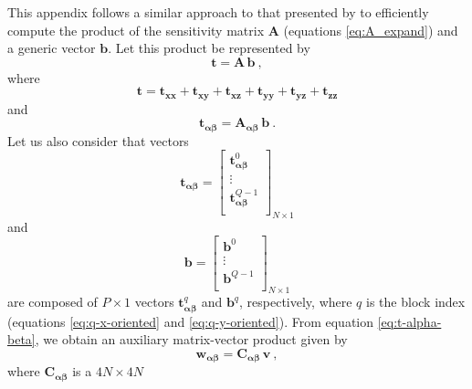 \documentclass[manuscript]{geophysics}
\begin{document}
This appendix follows a similar approach to that presented by \citet{takahashi2020convolutional}
to efficiently compute the product of the sensitivity matrix
$\mathbf{A}$ (equations \ref{eq:A_expand}) and a generic vector $\mathbf{b}$. 
Let this product be represented by
\begin{equation}
	\mathbf{t} = 
	\mathbf{A} \, \mathbf{b} \: ,
	\label{eq:t}
\end{equation}
where 
\begin{equation}
	\mathbf{t} = \mathbf{t}_{\boldsymbol{xx}} + \mathbf{t}_{\boldsymbol{xy}} + \mathbf{t}_{\boldsymbol{xz}} +
	\mathbf{t}_{\boldsymbol{yy}} + \mathbf{t}_{\boldsymbol{yz}} + \mathbf{t}_{\boldsymbol{zz}}
	\label{eq:t-components}
\end{equation}
and
\begin{equation}
	\mathbf{t}_{\boldsymbol{\alpha\beta}} = 
	\mathbf{A_{\boldsymbol{\alpha\beta}}} \, \mathbf{b} \: .
	\label{eq:t-alpha-beta}
\end{equation}
Let us also consider that vectors
\begin{equation}
	\mathbf{t}_{\boldsymbol{\alpha\beta}} = \begin{bmatrix}
		\mathbf{t}^{0}_{\boldsymbol{\alpha\beta}} \\
		\vdots \\
		\mathbf{t}^{Q-1}_{\boldsymbol{\alpha\beta}} \\
	\end{bmatrix}_{N \times 1}
	\label{eq:t-alpha-beta-partitioned}
\end{equation} 
and
\begin{equation}
	\mathbf{b} = \begin{bmatrix}
		\mathbf{b}^{0} \\
		\vdots \\
		\mathbf{b}^{Q-1} \\
	\end{bmatrix}_{N \times 1}
	\label{eq:b-partitioned}
\end{equation}
are composed of $P \times 1$ vectors $\mathbf{t}^{q}_{\boldsymbol{\alpha\beta}}$ and $\mathbf{b}^{q}$,
respectively, where $q$ is the block index (equations \ref{eq:q-x-oriented} and \ref{eq:q-y-oriented}). 
From equation \ref{eq:t-alpha-beta}, we obtain an auxiliary matrix-vector product given by
\begin{equation}
	\mathbf{w}_{\boldsymbol{\alpha\beta}} = \mathbf{C}_{\boldsymbol{\alpha\beta}} \, \mathbf{v} \: ,
	\label{eq:w_alpha_beta}
\end{equation}
where $\mathbf{C}_{\boldsymbol{\alpha\beta}}$ is a $4N \times 4N$ 
\end{document}
